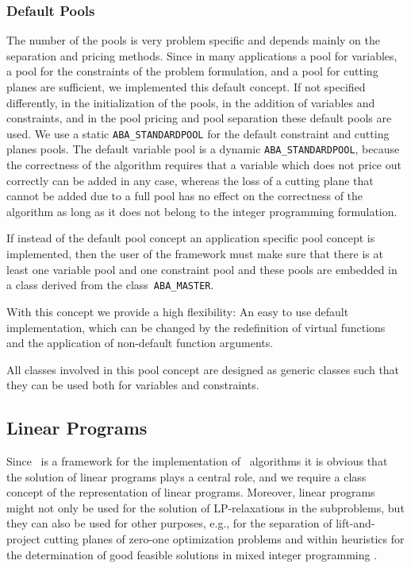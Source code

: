 \subsubsection{Default Pools}

The number of the pools is very problem specific and depends mainly
on the separation and pricing methods. 
Since in many applications a pool for variables, a pool for
the constraints of the problem formulation, and a pool for cutting planes
are sufficient, we implemented this default concept. 
If not specified
differently, in the initialization of the pools, in the addition of
variables and constraints, and in the pool pricing and pool separation
these default pools are used. We use a static {\tt ABA\_STANDARDPOOL}
for the default constraint and cutting planes pools. The
default variable pool is a dynamic {\tt ABA\_STANDARDPOOL}, because the
correctness of the algorithm requires that a variable which does
not price out correctly can be added in any case, 
whereas the loss of a cutting
plane that cannot be added due to a full pool has no effect on
the correctness of the algorithm as long as it does not belong to the
integer programming formulation.

If instead of the default pool concept an application specific pool
concept is implemented, then the user of the framework must make
sure that there is at least one variable pool and one constraint pool
and these pools are embedded in a class derived from the class~{\tt ABA\_MASTER}.

With this concept we provide a high flexibility:
An easy to use default implementation, which can be changed by
the redefinition of virtual functions and the application of non-default
function arguments.

All classes involved in this pool concept are designed as generic
classes such that they can be used both for variables and constraints.

\subsection{Linear Programs}

Since \ABACUS\ is a framework for the implementation of \lpbab\ algorithms
it is obvious that the solution of linear programs plays a central role,
and we require a class concept of the representation of
linear programs. Moreover, linear programs
might not only be used for the solution of LP-relaxations in the subproblems,
but they can also be used for other purposes, e.g., for the separation
of lift-and-project cutting planes of zero-one optimization problems
\cite{BCC93a, BCC93b} and within heuristics for the determination
of good feasible solutions in mixed integer programming \cite{HP93}.


